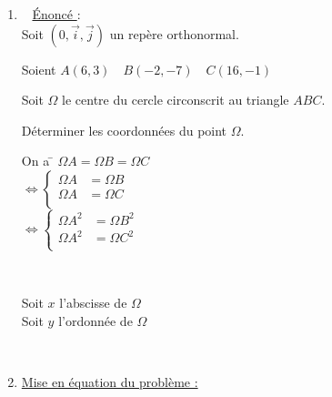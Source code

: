   \newpage
  

\begin{enumerate}
\reversemarginpar 

\vspace*{-1cm}
\item \marginpar[\underline{Ex \no 3}]~ \underline{ Énoncé }:\\

Soit $(0,\vec{i}, \vec{j})$ un repère orthonormal.

Soient $A(6,3) \quad B(-2,-7) \quad C (16,-1)$ 

Soit $\Omega$ le centre du cercle circonscrit au triangle $ABC$.

Déterminer les coordonnées du point $\Omega$.\\



\begin{tabbing}
On a \hspace*{1cm}\= $\Omega{A} = \Omega{B} = \Omega{C}$ \\ 
     \> $ \Longleftrightarrow  \begin{cases}
                        \Omega{A}\!\!\!\!\!\!\!\! &= \Omega{B} \\
                        \Omega{A} \!\!\!\!\!\!\!\!&= \Omega{C} \\
                   \end{cases} $ \\
     \> $ \Longleftrightarrow \begin{cases}
                        \Omega{A}^{2} \!\!\!\!\!\!\!\! &= \Omega{B}^{2} \\
                        \Omega{A}^{2} \!\!\!\!\!\!\!\! &= \Omega{C}^{2} \\
                   \end{cases} $ \\
\end{tabbing}

~\parbox{9cm}{Soit $x$ l'abscisse de $\Omega$ \\
              Soit $y$ l'ordonnée de $\Omega$}\\

\item \underline{Mise en équation du problème :  }\\



\end{enumerate}
